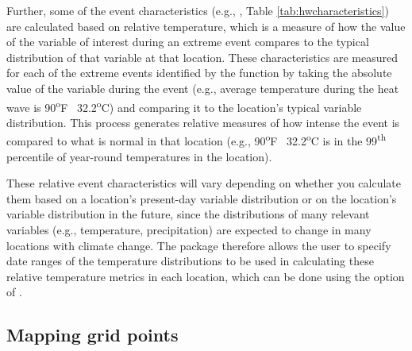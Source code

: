 Further, some of the event characteristics (e.g.,
, Table \ref{tab:hwcharacteristics}) are
calculated based on relative temperature, which is a measure of how the
value of the variable of interest during an extreme event compares to
the typical distribution of that variable at that location. These
characteristics are measured for each of the extreme events identified
by the  function by taking the absolute value of the
variable during the event (e.g., average temperature during the heat
wave is 90\textsuperscript{o}F ~32.2\textsuperscript{o}C) and comparing
it to the location's typical variable distribution. This process
generates relative measures of how intense the event is compared to what
is normal in that location (e.g., 90\textsuperscript{o}F
~32.2\textsuperscript{o}C is in the 99\textsuperscript{th} percentile of
year-round temperatures in the location).

These relative event characteristics will vary depending on whether you
calculate them based on a location's present-day variable distribution
or on the location's variable distribution in the future, since the
distributions of many relevant variables (e.g., temperature,
precipitation) are expected to change in many locations with climate
change. The package therefore allows the user to specify date ranges of
the temperature distributions to be used in calculating these relative
temperature metrics in each location, which can be done using the
 option of .

\subsection{Mapping grid points}\label{mapping-grid-points}

